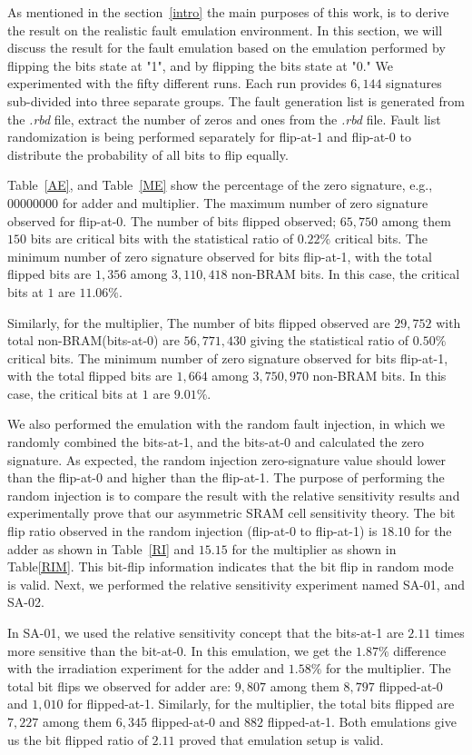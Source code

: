 As mentioned in the section~\ref{intro} the main purposes of this work, is to derive the result on the realistic fault emulation environment. In this section, we will discuss the result for the fault emulation based on the emulation performed by flipping the bits state at "1", and by flipping the bits state at "0." We experimented with the fifty different runs. Each run provides $6,144$ signatures sub-divided into three separate groups.  The fault generation list is generated from the \textit{.rbd} file, extract the number of zeros and ones from the \textit{.rbd} file. Fault list randomization is being performed separately for flip-at-1 and flip-at-0 to distribute the probability of all bits to flip equally. 

Table~\ref{AE}, and Table~\ref{ME} show the percentage of the zero signature, e.g., $00000000$ for adder and multiplier. The maximum number of zero signature observed for flip-at-0. The number of bits flipped observed; $65,750$ among them $150$ bits are critical bits with the statistical ratio of $0.22\%$ critical bits. The minimum number of zero signature observed for bits flip-at-1, with the total flipped bits are $1,356$ among $3,110,418$ non-BRAM bits. In this case, the critical bits at $1$ are $11.06\%$. 

Similarly, for the multiplier,  The number of bits flipped observed are $29,752$ with total non-BRAM(bits-at-0) are $56,771,430$ giving the statistical ratio of $0.50\%$ critical bits. The minimum number of zero signature observed for bits flip-at-1, with the total flipped bits are $1,664$ among $3,750,970$ non-BRAM bits. In this case, the critical bits at $1$ are $9.01\%$.


We also performed the emulation with the random fault injection, in which we randomly combined the bits-at-1, and the bits-at-0 and calculated the zero signature. As expected, the random injection zero-signature value should lower than the flip-at-0 and higher than the flip-at-1. The purpose of performing the random injection is to compare the result with the relative sensitivity results and experimentally prove that our asymmetric SRAM cell sensitivity theory. The bit flip ratio observed in the random injection (flip-at-0 to flip-at-1) is $18.10$ for the adder as shown in Table~\ref{RI} and $15.15$ for the multiplier as shown in Table\ref{RIM}. This bit-flip information indicates that the bit flip in random mode is valid. Next, we performed the relative sensitivity experiment named SA-01, and SA-02.

In SA-01, we used the relative sensitivity concept that the  bits-at-1 are $2.11$ times more sensitive than the bit-at-0. In this emulation, we get the $1.87\%$ difference with the irradiation experiment for the adder and $1.58\%$ for the multiplier. The total bit flips we observed for adder are: $9,807$ among them $8,797$ flipped-at-0 and $1,010$ for flipped-at-1. Similarly, for the multiplier, the total bits flipped are $7,227$ among them $6,345$ flipped-at-0 and $882$ flipped-at-1. Both emulations give us the bit flipped ratio of $2.11$ proved that emulation setup is valid.

